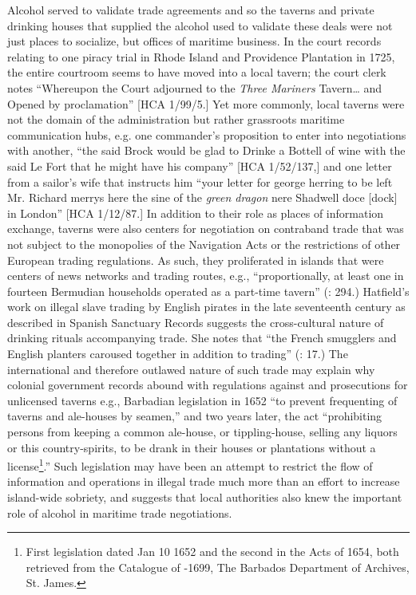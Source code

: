 Alcohol served to validate trade agreements and so the taverns and private drinking houses that supplied the alcohol used to validate these deals were not just places to socialize, but offices of maritime business. In the court records relating to one piracy trial in Rhode Island and Providence Plantation in 1725, the entire courtroom seems to have moved into a local tavern; the court clerk notes “Whereupon the Court adjourned to the \textit{Three Mariners} Tavern… and Opened by proclamation” [HCA 1/99/5.] Yet more commonly, local taverns were not the domain of the administration but rather grassroots maritime communication hubs, e.g. one commander’s proposition to enter into negotiations with another, “the said Brock would be glad to Drinke a Bottell of wine with the said Le Fort that he might have his company” [HCA 1/52/137,] and  one letter from a sailor’s wife that instructs him “your letter for george herring to be left Mr. Richard merrys here the sine of the \textit{green dragon} nere Shadwell doce [dock] in London” [HCA 1/12/87.] In addition to their role as places of information exchange, taverns were also centers for negotiation on contraband trade that was not subject to the monopolies of the Navigation Acts or the restrictions of other European trading regulations. As such, they proliferated in islands that were centers of news networks and trading routes, e.g., “proportionally, at least one in fourteen Bermudian households operated as a part-time tavern” (\citealt{Jarvis2010}: 294.) Hatfield’s work on illegal slave trading by English pirates in the late seventeenth century as described in Spanish Sanctuary Records suggests the cross-cultural nature of drinking rituals accompanying trade.  She notes that “the French smugglers and English planters caroused together in addition to trading” (\citealt{Hatfield2016}: 17.) The international and therefore outlawed nature of such trade may explain why colonial government records abound with regulations against and prosecutions for unlicensed taverns e.g., Barbadian legislation in 1652 “to prevent frequenting of taverns and ale-houses by seamen,” and two years later, the act “prohibiting persons from keeping a common ale-house, or tippling-house, selling any liquors or this country-spirits, to be drank in their houses or plantations without a license\footnote{First legislation dated Jan 10 1652 and the second in the Acts of 1654, both retrieved from the Catalogue of \citealt{Acts1642}-1699, The Barbados Department of Archives, St. James.}.” Such legislation may have been an attempt to restrict the flow of information and operations in illegal trade much more than an effort to increase island-wide sobriety, and suggests that local authorities also knew the important role of alcohol in maritime trade negotiations. 

